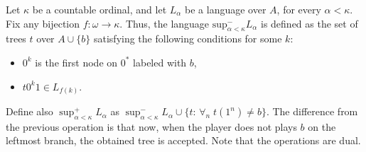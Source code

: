 \vspace{0.2cm}
 \hspace{0.1cm}

Let $\kappa$ be a countable ordinal, and let  $L_\alpha$ be a language over $A$,
for every $\alpha < \kappa$. Fix any bijection $f: \omega \to \kappa$. Thus, the language $\mathrm{sup}^-_{\alpha<\kappa} L_\alpha$ is defined as the set of trees $t$ over $A\cup\{b\}$ satisfying the following conditions for some $k$:
\begin{itemize}
\item $0^k$ is the first node on $0^*$ labeled with $b$,
\item $t0^k1 \in L_{f(k)}$.
\end{itemize}

Define also
$\sup^+ _{\alpha < \kappa} L_\alpha$ as $\sup^-_{\alpha < \kappa} L_\alpha\cup \{t :\, \forall_n\; t(1^n)\neq b\}$.
The difference from the previous operation is that now, when the
player does not plays $b$ on the leftmost branch, the obtained tree is
accepted. Note that the operations are dual. 
%





